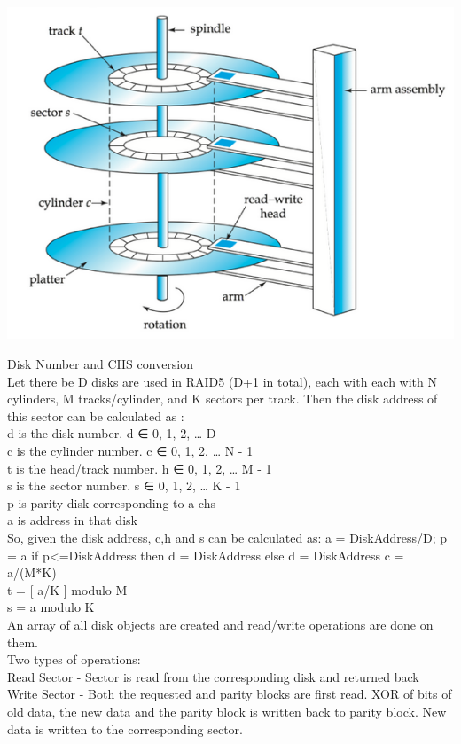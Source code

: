 \documentclass[11pt]{article}
\begin{document}
\begin{center}
\includegraphics[scale=0.5]{images/disk.png}
\end{center}
Disk Number and CHS conversion \\
Let there be D disks are used in RAID5 (D+1 in total), each with each with N cylinders, M tracks/cylinder, and K sectors per track. Then the disk address of this sector can be calculated as :
\\
d is the disk number. d  ∈ {0, 1, 2, …  D} \\
c is the cylinder number. c  ∈ {0, 1, 2, … N - 1} \\
t is the head/track number. h ∈ {0, 1, 2, … M - 1} \\
s is the sector number. s ∈ {0, 1, 2, … K - 1} \\
p is parity disk corresponding to a chs \\
a is address in that disk \\
So, given the disk address, c,h and s can be calculated  as:
a = DiskAddress/D;
p = a%
if p<=DiskAddress%
then d = DiskAddress%
else d = DiskAddress%
c = a/(M*K) \\
t = [ a/K ] modulo M \\
s = a modulo K \\

An array of all disk objects are created and read/write operations are done on them. \\
Two types of operations: \\
Read Sector -  Sector is read from the corresponding disk and returned back \\
Write Sector - Both the requested and parity blocks are first read. XOR of bits of old data, the new data and the parity block is written back to parity block. New data is written to the corresponding sector.
\end{document}
